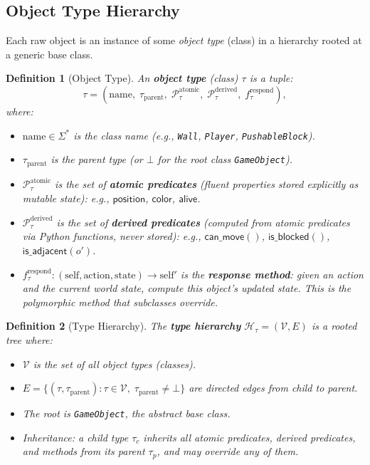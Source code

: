 \documentclass{article}
\newtheorem{definition}{Definition}
\newcommand{\calH}{\mathcal{H}}
\newcommand{\calP}{\mathcal{P}}
\newcommand{\calV}{\mathcal{V}}
\begin{document}
\subsection{Object Type Hierarchy}
\label{sec:type_hierarchy}

Each raw object is an instance of some \emph{object type} (class) in a
hierarchy rooted at a generic base class.

\begin{definition}[Object Type]
\label{def:object_type}
An \textbf{object type} (class) $\tau$ is a tuple:
\begin{equation}
\tau = (\text{name}, \; \tau_{\text{parent}}, \; \calP_\tau^{\text{atomic}},
       \; \calP_\tau^{\text{derived}}, \; f_\tau^{\text{respond}}),
\end{equation}
where:
\begin{itemize}[nosep]
    \item $\text{name} \in \Sigma^*$ is the class name
          (e.g., \texttt{Wall}, \texttt{Player}, \texttt{PushableBlock}).
    \item $\tau_{\text{parent}}$ is the parent type (or $\bot$ for the root
          class \texttt{GameObject}).
    \item $\calP_\tau^{\text{atomic}}$ is the set of \textbf{atomic predicates}
          (fluent properties stored explicitly as mutable state):
          e.g., $\mathsf{position}$, $\mathsf{color}$, $\mathsf{alive}$.
    \item $\calP_\tau^{\text{derived}}$ is the set of \textbf{derived predicates}
          (computed from atomic predicates via Python functions, never stored):
          e.g., $\mathsf{can\_move}()$, $\mathsf{is\_blocked}()$,
          $\mathsf{is\_adjacent}(o')$.
    \item $f_\tau^{\text{respond}} : (\text{self}, \text{action}, \text{state})
          \to \text{self}'$ is the \textbf{response method}: given an action and
          the current world state, compute this object's updated state.  This
          is the polymorphic method that subclasses override.
\end{itemize}
\end{definition}

\begin{definition}[Type Hierarchy]
\label{def:type_tree}
The \textbf{type hierarchy} $\calH_\tau = (\calV, E)$ is a rooted tree where:
\begin{itemize}[nosep]
    \item $\calV$ is the set of all object types (classes).
    \item $E = \{(\tau, \tau_{\text{parent}}) : \tau \in \calV,\;
          \tau_{\text{parent}} \neq \bot\}$ are directed edges from child to
          parent.
    \item The root is \texttt{GameObject}, the abstract base class.
    \item Inheritance: a child type $\tau_c$ inherits all atomic predicates,
          derived predicates, and methods from its parent $\tau_p$, and may
          override any of them.
\end{itemize}
\end{definition}
\end{document}
